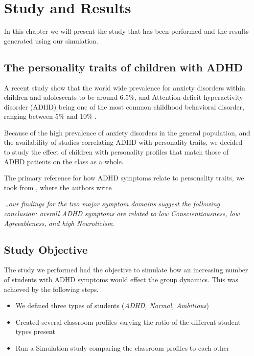 \chapter{Study and Results}
In this chapter we will present the study that has been performed and the results
generated using our simulation.

\section{The personality traits of children with ADHD}
A recent study \cite{Polanczyk2015} show that the world wide prevalence
for anxiety disorders within children and adolescents to be around 6.5\%, and 
Attention-deficit hyperactivity disorder (ADHD)\cite{Barkley1997} being one
of the most common childhood behavioral disorder, ranging between 5\% and 10\% \cite{Sayal2018}.

\bb

Because of the high prevalence of anxiety disorders in the general population,
and the availability of studies correlating ADHD with personality traits, we
decided to study the effect of children with personality profiles that match those
of ADHD patients on the class as a whole.

\bb

The primary reference for how ADHD symptoms relate to personality traits, we took
from \cite{Nigg2002}, where the authors write

\textit{\dots our findings for the two major symptom domains suggest the following
conclusion: overall ADHD symptoms are related to low Conscientiousness, low Agreeableness, and high Neuroticism.}

\section{Study Objective}
The study we performed had the objective to simulate how an increasing number of
students with ADHD symptoms would effect the group dynamics. This was achieved by
the following steps.

\begin{itemize}
    \item We defined three types of students (\textit{ADHD, Normal, Ambitious})
    \item Created several classroom profiles varying the ratio of the different student types present
    \item Run a Simulation study comparing the classroom profiles to each other
\end{itemize}

